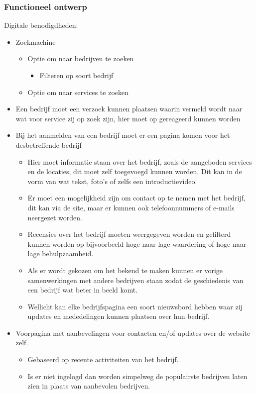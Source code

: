 \subsubsection{Functioneel ontwerp}

Digitale benodigdheden:

\begin{itemize}
\item
  Zoekmachine
  \begin{itemize}
  \item
    Optie om naar bedrijven te zoeken
    \begin{itemize}
    \item
      Filteren op soort bedrijf
    \end{itemize}
  \item
    Optie om naar services te zoeken
  \end{itemize}
\item  
  Een bedrijf moet een verzoek kunnen plaatsen waarin vermeld wordt naar
  wat voor service zij op zoek zijn, hier moet op gereageerd kunnen
  worden
\item
  Bij het aanmelden van een bedrijf moet er een pagina komen voor het
  desbetreffende bedrijf
  
  \begin{itemize}
  \item
    Hier moet informatie staan over het bedrijf,
    zoals de aangeboden services en de locaties,
    dit moet zelf toegevoegd kunnen worden.
    Dit kan in de vorm van wat tekst,
    foto’s of zelfs een introductievideo.
  \item
    Er moet een mogelijkheid zijn om contact op te nemen met het bedrijf,
    dit kan via de site, maar er kunnen ook telefoonnummers of
    e-mails neergezet worden.
  \item
    Recensies over het bedrijf moeten weergegeven worden en
    gefilterd kunnen worden op bijvoorbeeld hoge naar lage waardering of
    hoge naar lage behulpzaamheid.
  \item
    Als er wordt gekozen om het bekend te maken kunnen er vorige
    samenwerkingen met andere bedrijven staan zodat de geschiedenis van
    een bedrijf wat beter in beeld komt.
  \item
    Wellicht kan elke bedrijfspagina een soort nieuwsbord hebben
    waar zij updates en mededelingen kunnen plaatsen over hun bedrijf.
  \end{itemize}

  \item
    Voorpagina met aanbevelingen voor contacten en/of updates over de
    website zelf.
  
  \begin{itemize}
  \item
    Gebaseerd op recente activiteiten van het bedrijf.
  \item
    Is er niet ingelogd dan worden simpelweg de populairste
    bedrijven laten zien in plaats van aanbevolen bedrijven.
  \end{itemize}
\end{itemize}

